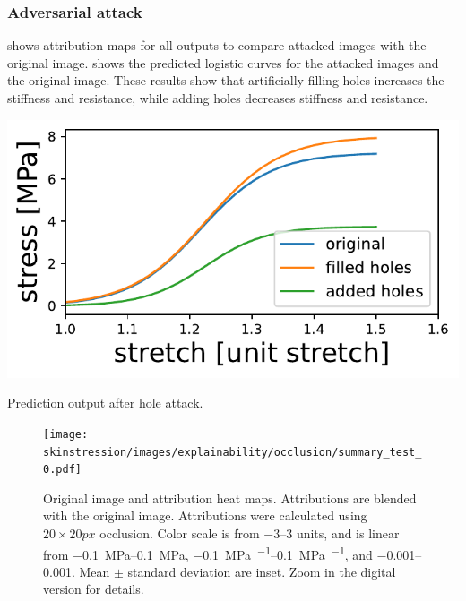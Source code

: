 
\subsubsection{Adversarial attack}
 shows attribution maps for all outputs to compare attacked images with the original image.
 shows the predicted logistic curves for the attacked images and the original image.
These results show that artificially filling holes increases the stiffness and resistance, while adding holes decreases stiffness and resistance.
\begin{marginfigure}[-5\baselineskip]
    \includegraphics{skinstression/images/attack/holes.pdf}
    \caption[Prediction output after hole attack]{
        Prediction output after hole attack.
    }
    \label{fig:pred_output_attack}
\end{marginfigure}

\begin{figure}
    \centering
    \texttt{[image: skinstression/images/explainability/occlusion/summary\_test\_0.pdf]}
    \caption[Original image and attribution heat maps]{
        Original image and attribution heat maps.
        Attributions are blended with the original image.
        Attributions were calculated using $20\times 20\unit{px}$ occlusion.
        Color scale is from \numrange{-3}{3} units, and is linear from \qtyrange{-0.1}{0.1}{\mega\pascal}, \qtyrange{-0.1}{0.1}{\mega\pascal\per\stretch}, and \qtyrange{-0.001}{0.001}{\stretch}.
        Mean $\pm$ standard deviation are inset.
        Zoom in the digital version for details.
    }
    \label{fig:skin_occlusion}
\end{figure}


